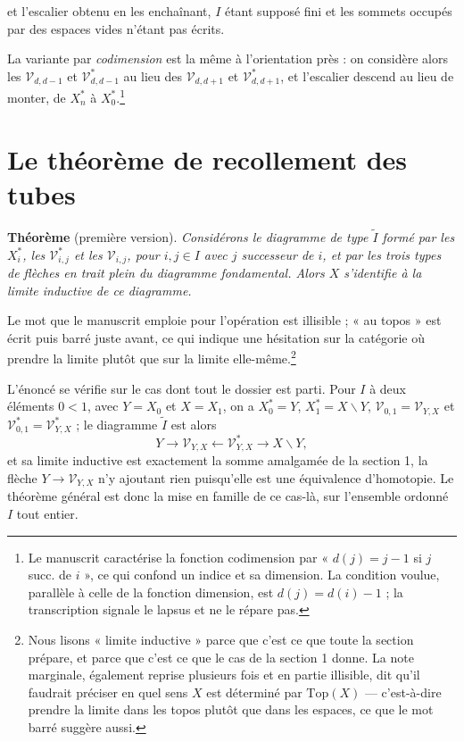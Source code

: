 \documentclass[11pt,a4paper]{article}
\begin{document}

et l'escalier obtenu en les enchaînant, $I$ étant supposé fini et les sommets
occupés par des espaces vides n'étant pas écrits.

La variante par \emph{codimension} est la même à l'orientation près : on
considère alors les $\mathcal{V}_{d,d-1}$ et $\mathcal{V}^{*}_{d,d-1}$ au lieu
des $\mathcal{V}_{d,d+1}$ et $\mathcal{V}^{*}_{d,d+1}$, et l'escalier descend au
lieu de monter, de $X_{n}^{*}$ à $X_{0}^{*}$.\footnote{Le manuscrit caractérise
la fonction codimension par « $d(j) = j - 1$ si $j$ succ. de $i$ », ce qui
confond un indice et sa dimension. La condition voulue, parallèle à celle de la
fonction dimension, est $d(j) = d(i) - 1$ ; la transcription signale le lapsus
et ne le répare pas.}

\section*{Le théorème de recollement des tubes}

\textbf{Théorème} (première version). \emph{Considérons le diagramme de type
$\widetilde{I}$ formé par les $X_{i}^{*}$, les $\mathcal{V}^{*}_{i,j}$ et les
$\mathcal{V}_{i,j}$, pour $i,j \in I$ avec $j$ successeur de $i$, et par les
trois types de flèches en trait plein du diagramme fondamental. Alors $X$
s'identifie à la limite inductive de ce diagramme.}

Le mot que le manuscrit emploie pour l'opération est illisible ; « au topos »
est écrit puis barré juste avant, ce qui indique une hésitation sur la catégorie
où prendre la limite plutôt que sur la limite
elle-même.\footnote{Nous lisons « limite inductive » parce que c'est ce que toute
la section prépare, et parce que c'est ce que le cas de la section 1 donne. La
note marginale, également reprise plusieurs fois et en partie illisible, dit
qu'il faudrait préciser en quel sens $X$ est déterminé par $\mathrm{Top}(X)$ —
c'est-à-dire prendre la limite dans les topos plutôt que dans les espaces, ce
que le mot barré suggère aussi.}

L'énoncé se vérifie sur le cas dont tout le dossier est parti. Pour $I$ à deux
éléments $0 < 1$, avec $Y = X_{0}$ et $X = X_{1}$, on a $X_{0}^{*} = Y$,
$X_{1}^{*} = X \smallsetminus Y$, $\mathcal{V}_{0,1} = \mathcal{V}_{Y,X}$ et
$\mathcal{V}^{*}_{0,1} = \mathcal{V}^{*}_{Y,X}$ ; le diagramme $\widetilde{I}$
est alors
\[
  Y \longrightarrow \mathcal{V}_{Y,X} \longleftarrow \mathcal{V}^{*}_{Y,X}
  \longrightarrow X \smallsetminus Y,
\]
et sa limite inductive est exactement la somme amalgamée de la section 1, la
flèche $Y \to \mathcal{V}_{Y,X}$ n'y ajoutant rien puisqu'elle est une
équivalence d'homotopie. Le théorème général est donc la mise en famille de ce
cas-là, sur l'ensemble ordonné $I$ tout entier.
\end{document}
